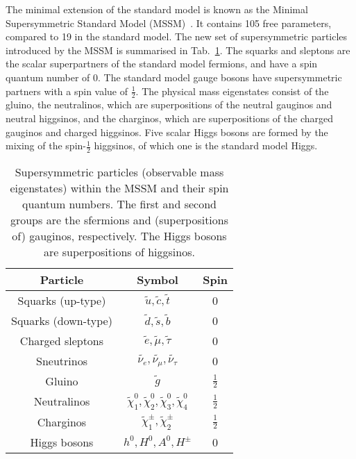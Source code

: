 The minimal extension of the standard model is known as the Minimal 
Supersymmetric Standard Model (MSSM)~\cite{mssm}. It contains 105 free 
parameters, compared to 19 in the standard model.
The new set of supersymmetric particles introduced by the MSSM is summarised in 
Tab.~\ref{tab:mssm}. The squarks and sleptons are the scalar superpartners of 
the standard model fermions, and have a spin quantum number of 0. The standard 
model gauge bosons have supersymmetric partners with a spin value of 
$\frac{1}{2}$. The physical mass eigenstates consist of the gluino, the 
neutralinos, which are superpositions of the neutral gauginos and neutral 
higgsinos, and the charginos, which are superpositions of the charged gauginos 
and charged higgsinos. Five scalar Higgs bosons are formed by the mixing of the 
{spin-$\frac{1}{2}$} higgsinos, of which one is the standard model Higgs.

\begin{table}
\centering
\begin{tabular}{ccc}
\hline
Particle & Symbol & Spin \\
\hline
Squarks (up-type)   & $\tilde{u},\tilde{c},\tilde{t}$ & 0 \\
Squarks (down-type) & $\tilde{d},\tilde{s},\tilde{b}$ & 0 \\
Charged sleptons & $\tilde{e},\tilde{\mu},\tilde{\tau}$ & 0 \\
Sneutrinos & $\widetilde{\nu_{e}},\widetilde{\nu_{\mu}},\widetilde{\nu_{\tau}}$ 
& 0 \\
\hline
Gluino & $\tilde{g}$ & $\frac{1}{2}$ \\
Neutralinos &
$\widetilde{\chi}_1^0,\widetilde{\chi}_2^0,\widetilde{\chi}_3^0,\widetilde{\chi}_4^0$
& $\frac{1}{2}$ \\
Charginos & $\widetilde{\chi}_1^{\pm},\widetilde{\chi}_2^{\pm}$ &
$\frac{1}{2}$ \\
\hline
Higgs bosons & $h^0,H^0,A^0,H^{\pm}$ & 0 \\
\hline
\end{tabular}
\caption{Supersymmetric particles (observable mass eigenstates) within the MSSM 
and their spin quantum numbers. The first and second groups are the sfermions 
and (superpositions of) gauginos, respectively. The Higgs bosons are 
superpositions of higgsinos.}
\label{tab:mssm}
\end{table}

